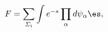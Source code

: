 \begin{equation}
F= \sum_{{\mit\Sigma}_i} \int e^{-s} \displaystyle \prod_\alpha 
d \psi_\alpha \es,
\label{eq:vcmAmp}
\end{equation}

